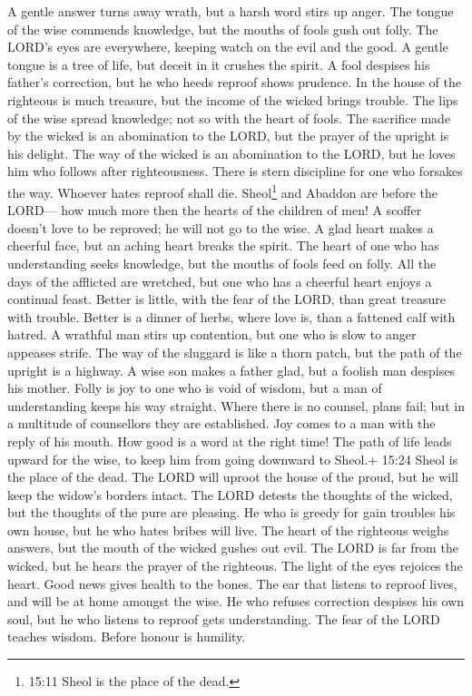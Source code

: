  A gentle answer turns away wrath, but a harsh word stirs up
anger.  The tongue of the wise commends knowledge, but the
mouths of fools gush out folly.  The LORD's eyes are
everywhere, keeping watch on the evil and the good.  A
gentle tongue is a tree of life, but deceit in it crushes the spirit.
 A fool despises his father's correction, but he who heeds
reproof shows prudence.  In the house of the righteous is
much treasure, but the income of the wicked brings trouble. 
The lips of the wise spread knowledge; not so with the heart of fools.
 The sacrifice made by the wicked is an abomination to the
LORD, but the prayer of the upright is his delight.  The way
of the wicked is an abomination to the LORD, but he loves him who
follows after righteousness.  There is stern discipline for
one who forsakes the way. Whoever hates reproof shall die. 
Sheol\footnote{15:11 Sheol is the place of the dead.} and Abaddon are
before the LORD--- how much more then the hearts of the children of men!
 A scoffer doesn't love to be reproved; he will not go to
the wise.  A glad heart makes a cheerful face, but an
aching heart breaks the spirit.  The heart of one who has
understanding seeks knowledge, but the mouths of fools feed on folly.
 All the days of the afflicted are wretched, but one who
has a cheerful heart enjoys a continual feast.  Better is
little, with the fear of the LORD, than great treasure with trouble.
 Better is a dinner of herbs, where love is, than a
fattened calf with hatred.  A wrathful man stirs up
contention, but one who is slow to anger appeases strife. 
The way of the sluggard is like a thorn patch, but the path of the
upright is a highway.  A wise son makes a father glad, but
a foolish man despises his mother.  Folly is joy to one who
is void of wisdom, but a man of understanding keeps his way straight.
 Where there is no counsel, plans fail; but in a multitude
of counsellors they are established.  Joy comes to a man
with the reply of his mouth. How good is a word at the right time!
 The path of life leads upward for the wise, to keep him
from going downward to Sheol.+ 15:24 Sheol is the place of the dead.
 The LORD will uproot the house of the proud, but he will
keep the widow's borders intact.  The LORD detests the
thoughts of the wicked, but the thoughts of the pure are pleasing.
 He who is greedy for gain troubles his own house, but he
who hates bribes will live.  The heart of the righteous
weighs answers, but the mouth of the wicked gushes out evil.
 The LORD is far from the wicked, but he hears the prayer
of the righteous.  The light of the eyes rejoices the
heart. Good news gives health to the bones.  The ear that
listens to reproof lives, and will be at home amongst the wise.
 He who refuses correction despises his own soul, but he
who listens to reproof gets understanding.  The fear of the
LORD teaches wisdom. Before honour is humility.

